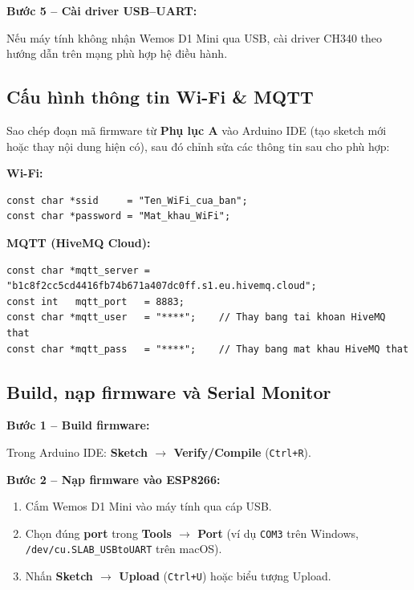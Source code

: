 \documentclass[13pt,a4paper]{article}
\newcommand{\code}[1]{\texttt{#1}}
\begin{document}
\textbf{Bước 5 -- Cài driver USB--UART:}

Nếu máy tính không nhận Wemos D1 Mini qua USB, cài driver CH340 theo hướng dẫn trên mạng phù hợp hệ điều hành.

\subsection{Cấu hình thông tin Wi-Fi \& MQTT}
\label{sec:config}

Sao chép đoạn mã firmware từ \textbf{Phụ lục A} vào Arduino IDE (tạo sketch mới hoặc thay nội dung hiện có), sau đó chỉnh sửa các thông tin sau cho phù hợp:

\textbf{Wi-Fi:}

\begin{lstlisting}[style=cppcode, caption={Cấu hình Wi-Fi trong firmware (Phụ lục A)}, label={lst:wificfg}]
const char *ssid     = "Ten_WiFi_cua_ban";
const char *password = "Mat_khau_WiFi";
\end{lstlisting}

\textbf{MQTT (HiveMQ Cloud):}

\begin{lstlisting}[style=cppcode, caption={Cấu hình MQTT trong firmware (Phụ lục A)}, label={lst:mqttcfg}]
const char *mqtt_server = "b1c8f2cc5cd4416fb74b671a407dc0ff.s1.eu.hivemq.cloud";
const int   mqtt_port   = 8883;
const char *mqtt_user   = "****";    // Thay bang tai khoan HiveMQ that
const char *mqtt_pass   = "****";    // Thay bang mat khau HiveMQ that
\end{lstlisting}

\subsection{Build, nạp firmware và Serial Monitor}
\label{sec:build}

\textbf{Bước 1 -- Build firmware:}

Trong Arduino IDE: \textbf{Sketch $\rightarrow$ Verify/Compile} (\code{Ctrl+R}).

\textbf{Bước 2 -- Nạp firmware vào ESP8266:}

\begin{enumerate}[label=\arabic*., leftmargin=1.5cm]
    \item Cắm Wemos D1 Mini vào máy tính qua cáp USB.
    \item Chọn đúng \textbf{port} trong \textbf{Tools $\rightarrow$ Port} (ví dụ \code{COM3} trên Windows, \code{/dev/cu.SLAB\_USBtoUART} trên macOS).
    \item Nhấn \textbf{Sketch $\rightarrow$ Upload} (\code{Ctrl+U}) hoặc biểu tượng Upload.
\end{enumerate}
\end{document}
